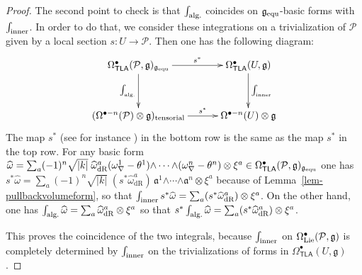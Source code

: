 \documentclass[number]{elsarticle}
\theoremstyle{definition}
\theoremstyle{remark}
\numberwithin{equation}{section}
\begin{document}
\begin{proof}
The second point to check is that $\int_{{\text{\textup{alg.}}}}$ coincides on ${{\mathfrak g}}_{{\text{\textup{equ}}}}$-basic forms with $\int_{{\text{\textup{inner}}}}$. In order to do that, we consider these integrations on a trivialization of ${{{{\mathcal{{P}}}}}}$ given by a local section $s : U \rightarrow {{{{\mathcal{{P}}}}}}$. Then one has the following diagram:
\begin{equation*}
\xymatrix@R=8ex@C=30pt{
  {\Omega^{\bullet}_{{{{\mathbf{\mathsf{{TLA}}}}}}}({{{{\mathcal{{P}}}}}},{{\mathfrak g}})_{{{\mathfrak g}}_{{\text{\textup{equ}}}}}} \ar[d]_-{\int_{{\text{\textup{alg.}}}}} \ar[r]^-{s^\ast}
& {\Omega^{\bullet}_{{{{\mathbf{\mathsf{{TLA}}}}}}}(U,{{\mathfrak g}})} \ar[d]^-{\int_{{\text{\textup{inner}}}}}
\\
  {(\Omega^{{\bullet}-n}({{{{\mathcal{{P}}}}}})\otimes {{\mathfrak g}})_{\text{tensorial}}} \ar[r]^-{s^\ast}  
& {\Omega^{{\bullet}-n}(U) \otimes {{\mathfrak g}}} 
 }
\end{equation*}
The map $s^\ast$ (see for instance \cite{KobaNomi96a}) in the bottom row is the same as the map $s^\ast$ in the top row. For any basic form ${\widehat{\omega}} = \sum_a (-1)^n \sqrt{|k|}\; {\widehat{\omega}}^a_{{\text{dR}}} (\omega_\nabla^{1} - \theta^1) {\mathord{\wedge}} \cdots {\mathord{\wedge}} (\omega_\nabla^{n} - \theta^n) \otimes \xi^a \in \Omega^{\bullet}_{{{{\mathbf{\mathsf{{TLA}}}}}}}({{{{\mathcal{{P}}}}}},{{\mathfrak g}})_{{{\mathfrak g}}_{{\text{\textup{equ}}}}}$ one has 
$s^\ast {\widehat{\omega}} = \sum_a (-1)^n \sqrt{|k|}\; (s^\ast{\widehat{\omega}}^a_{{\text{dR}}})\, {\mathfrak{a}}^{1} {\mathord{\wedge}} \cdots {\mathord{\wedge}} {\mathfrak{a}}^{n}  \otimes \xi^a$ 
because of Lemma~\ref{lem-pullbackvolumeform}, so that
$\int_{{\text{\textup{inner}}}} s^\ast {\widehat{\omega}} = \sum_a (s^\ast{\widehat{\omega}}^a_{{\text{dR}}}) \otimes \xi^a$. 
On the other hand, one has
$\int_{{\text{\textup{alg.}}}} {\widehat{\omega}} = \sum_a {\widehat{\omega}}^a_{{\text{dR}}} \otimes \xi^a$
so that
$s^\ast \int_{{\text{\textup{alg.}}}} {\widehat{\omega}} = \sum_a (s^\ast{\widehat{\omega}}^a_{{\text{dR}}}) \otimes \xi^a$.

This proves the coincidence of the two integrals, because $\int_{{\text{\textup{inner}}}}$ on $\Omega^{\bullet}_{{\text{\textup{Lie}}}}({{{{\mathcal{{P}}}}}}, {{\mathfrak g}})$ is completely determined by $\int_{{\text{\textup{inner}}}}$ on the trivializations of forms in $\Omega^{\bullet}_{{{{\mathbf{\mathsf{{TLA}}}}}}}(U,{{\mathfrak g}})$.
\end{proof}
\end{document}
